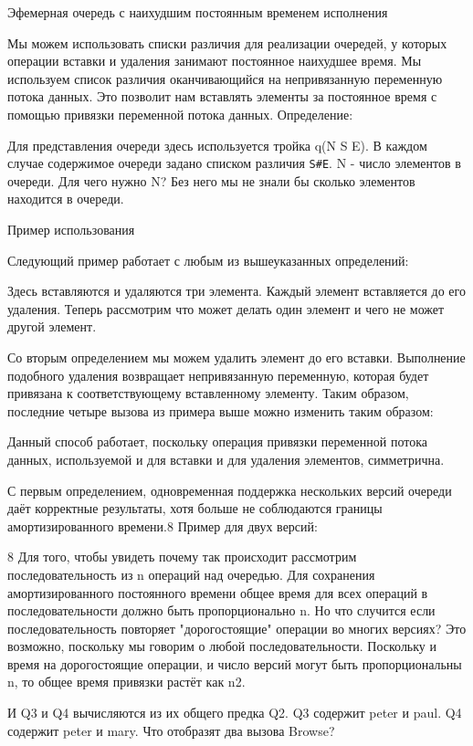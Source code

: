 Эфемерная очередь с наихудшим постоянным временем исполнения

Мы можем использовать списки различия для реализации очередей, у которых операции вставки и удаления занимают постоянное наихудшее время. Мы используем список различия оканчивающийся на непривязанную переменную потока данных. Это позволит нам вставлять элементы за постоянное время с помощью привязки переменной потока данных. Определение:

Для представления очереди здесь используется тройка q(N S E). В каждом случае содержимое очереди задано списком различия \verb!S#E!. N - число элементов в очереди. Для чего нужно N? Без него мы не знали бы сколько элементов находится в очереди.

Пример использования

Следующий пример работает с любым из вышеуказанных определений:

Здесь вставляются и удаляются три элемента. Каждый элемент вставляется до его удаления. Теперь рассмотрим что может делать один элемент и чего не может другой элемент.

Со вторым определением мы можем удалить элемент до его вставки. Выполнение подобного удаления возвращает непривязанную переменную, которая будет привязана к соответствующему вставленному элементу. Таким образом, последние четыре вызова из примера выше можно изменить таким образом:

Данный способ работает, поскольку операция привязки переменной потока данных, используемой и для вставки и для удаления элементов, симметрична.

С первым определением, одновременная поддержка нескольких версий очереди даёт корректные результаты, хотя больше не соблюдаются границы амортизированного времени.8 Пример для двух версий:

8 Для того, чтобы увидеть почему так происходит рассмотрим последовательность из n операций над очередью. Для сохранения амортизированного постоянного времени общее время для всех операций в последовательности должно быть пропорционально n. Но что случится если последовательность повторяет "дорогостоящие" операции во многих версиях? Это возможно, поскольку мы говорим о любой последовательности. Поскольку и время на дорогостоящие операции, и число версий могут быть пропорциональны n, то общее время привязки растёт как n2.

И Q3 и Q4 вычисляются из их общего предка Q2. Q3 содержит peter и paul. Q4 содержит peter и mary. Что отобразят два вызова Browse?

